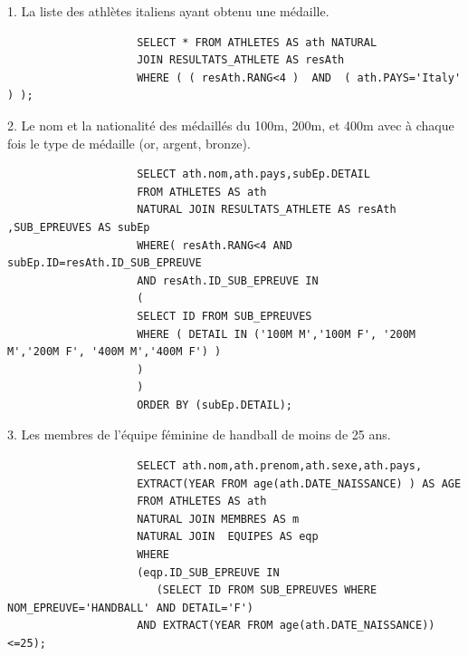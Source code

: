 \documentclass[]{scrreprt}
\begin{document}
			{\large 
				1. La liste des athlètes italiens ayant obtenu une médaille.
				
			}
			
			{\footnotesize 
				\begin{tcolorbox}
					\begin{verbatim}
					SELECT * FROM ATHLETES AS ath NATURAL 
					JOIN RESULTATS_ATHLETE AS resAth
					WHERE ( ( resAth.RANG<4 )  AND  ( ath.PAYS='Italy' ) );
					\end{verbatim}
				\end{tcolorbox}
			}
			
			\vspace{0.5cm}
			
			{\large 
				2. Le nom et la nationalité des médaillés du 100m, 200m, et 400m avec à chaque fois le type de
				médaille (or, argent, bronze).
				
			}
		
			{\footnotesize 
				\begin{tcolorbox}
					\begin{verbatim}
					SELECT ath.nom,ath.pays,subEp.DETAIL 
					FROM ATHLETES AS ath 
					NATURAL JOIN RESULTATS_ATHLETE AS resAth ,SUB_EPREUVES AS subEp
					WHERE( resAth.RANG<4 AND subEp.ID=resAth.ID_SUB_EPREUVE 
					AND resAth.ID_SUB_EPREUVE IN 
					( 
					SELECT ID FROM SUB_EPREUVES
					WHERE ( DETAIL IN ('100M M','100M F', '200M M','200M F', '400M M','400M F') )
					)
					)
					ORDER BY (subEp.DETAIL);
					\end{verbatim}
				\end{tcolorbox}
			}
		
			\vspace{0.5cm}
			
			{\large 
				3. Les membres de l'équipe féminine de handball de moins de 25 ans.
				
			}
			
			{\footnotesize 
				\begin{tcolorbox}
					\begin{verbatim}
					SELECT ath.nom,ath.prenom,ath.sexe,ath.pays,
					EXTRACT(YEAR FROM age(ath.DATE_NAISSANCE) ) AS AGE 
					FROM ATHLETES AS ath 
					NATURAL JOIN MEMBRES AS m 
					NATURAL JOIN  EQUIPES AS eqp
					WHERE 
					(eqp.ID_SUB_EPREUVE IN 
					   (SELECT ID FROM SUB_EPREUVES WHERE NOM_EPREUVE='HANDBALL' AND DETAIL='F')
					AND EXTRACT(YEAR FROM age(ath.DATE_NAISSANCE))<=25);
					\end{verbatim}
				\end{tcolorbox}
			}
		
\end{document}
